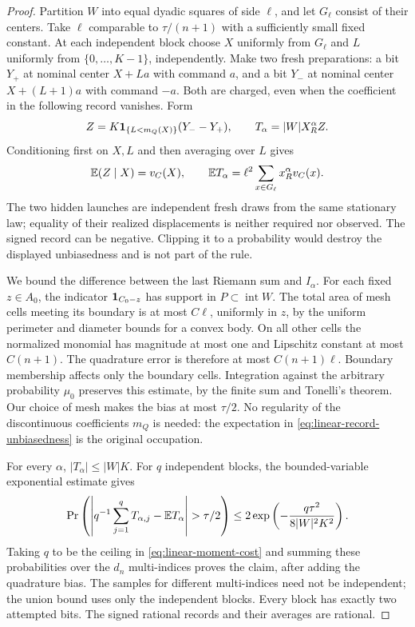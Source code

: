 \begin{proof}
Partition $W$ into equal dyadic squares of side $\ell$, and let
$G_\ell$ consist of their centers. Take $\ell$ comparable to
$\tau/(n+1)$ with a sufficiently small fixed constant. At each
independent block choose $X$ uniformly from $G_\ell$ and $L$
uniformly from $\{0,\ldots,K-1\}$, independently. Make two fresh
preparations: a bit $Y_+$ at nominal center $X+La$ with command $a$,
and a bit $Y_-$ at nominal center $X+(L+1)a$ with command $-a$.
Both are charged, even when the coefficient in the following record
vanishes. Form
\begin{equation}\label{eq:linear-two-bit-record}
 Z=K\mathbf 1_{\{L<m_Q(X)\}}(Y_--Y_+),
           \qquad T_\alpha=|W|X_R^\alpha Z.
\end{equation}
Conditioning first on $X,L$ and then averaging over $L$ gives
\begin{equation}\label{eq:linear-record-unbiasedness}
 \mathbb E(Z\mid X)=v_C(X),\qquad
 \mathbb E T_\alpha=\ell^2\sum_{x\in G_\ell}x_R^\alpha v_C(x).
\end{equation}
The two hidden launches are independent fresh draws from the same
stationary law; equality of their realized displacements is neither
required nor observed. The signed record can be negative. Clipping
it to a probability would destroy the displayed unbiasedness and
is not part of the rule.

We bound the difference between the last Riemann sum and $I_\alpha$.
For each fixed $z\in A_0$, the indicator $\mathbf 1_{C_0-z}$ has support
in $P\subset\operatorname{int}W$. The total area of mesh cells
meeting its boundary is at most $C\ell$, uniformly in $z$, by the
uniform perimeter and diameter bounds for a convex body. On all
other cells the normalized monomial has magnitude at most one and
Lipschitz constant at most $C(n+1)$. The quadrature error is therefore
at most $C(n+1)\ell$. Boundary membership affects only the boundary
cells. Integration against the arbitrary probability $\mu_0$
preserves this estimate, by the finite sum and Tonelli's theorem.
Our choice of mesh makes the bias at most $\tau/2$. No regularity
of the discontinuous coefficients $m_Q$ is needed: the expectation
in \eqref{eq:linear-record-unbiasedness} is the original occupation.

For every $\alpha$, $|T_\alpha|\le |W|K$. For $q$ independent
blocks, the bounded-variable exponential estimate gives
\[
 \Pr\left(\left|q^{-1}\sum_{j=1}^qT_{\alpha,j}
                  -\E T_\alpha\right|>\tau/2\right)
       \le 2\exp\left(-\frac{q\tau^2}{8|W|^2K^2}\right).
\]
Taking $q$ to be the ceiling in \eqref{eq:linear-moment-cost} and
summing these probabilities over the $d_n$ multi-indices proves the
claim, after adding the quadrature bias. The samples for different
multi-indices need not be independent; the union bound uses only
the independent blocks. Every block has exactly two attempted bits.
The signed rational records and their averages are rational.


\end{proof}
